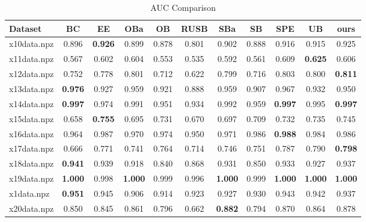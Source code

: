 \documentclass{article}
\begin{document}
\begin{table}[htbp]
\centering
\caption{AUC Comparison}
\begin{adjustbox}{width=\textwidth}
\label{tab:auc_comparison}
\begin{tabular}{lcccccccccc}
\hline
\textbf{Dataset} & \textbf{BC} & \textbf{EE} & \textbf{OBa} & \textbf{OB} & \textbf{RUSB} & \textbf{SBa} & \textbf{SB} & \textbf{SPE} & \textbf{UB} & \textbf{ours} \\
\hline
x10data.npz & 0.896 & \cellcolor{graybg}\textbf{0.926} & 0.899 & 0.878 & 0.801 & 0.902 & 0.888 & 0.916 & 0.915 & 0.925 \\
x11data.npz & 0.567 & 0.602 & 0.604 & 0.553 & 0.535 & 0.592 & 0.561 & 0.609 & \cellcolor{graybg}\textbf{0.625} & 0.606 \\
x12data.npz & 0.752 & 0.778 & 0.801 & 0.712 & 0.622 & 0.799 & 0.716 & 0.803 & 0.800 & \cellcolor{graybg}\textbf{0.811} \\
x13data.npz & \cellcolor{graybg}\textbf{0.976} & 0.927 & 0.959 & 0.921 & 0.888 & 0.959 & 0.907 & 0.967 & 0.932 & 0.950 \\
x14data.npz & \cellcolor{graybg}\textbf{0.997} & 0.974 & 0.991 & 0.951 & 0.934 & 0.992 & 0.959 & \cellcolor{graybg}\textbf{0.997} & 0.995 & \cellcolor{graybg}\textbf{0.997} \\
x15data.npz & 0.658 & \cellcolor{graybg}\textbf{0.755} & 0.695 & 0.731 & 0.670 & 0.697 & 0.709 & 0.732 & 0.735 & 0.745 \\
x16data.npz & 0.964 & 0.987 & 0.970 & 0.974 & 0.950 & 0.971 & 0.986 & \cellcolor{graybg}\textbf{0.988} & 0.984 & 0.986 \\
x17data.npz & 0.666 & 0.771 & 0.741 & 0.764 & 0.714 & 0.746 & 0.751 & 0.787 & 0.790 & \cellcolor{graybg}\textbf{0.798} \\
x18data.npz & \cellcolor{graybg}\textbf{0.941} & 0.939 & 0.918 & 0.840 & 0.868 & 0.931 & 0.850 & 0.933 & 0.927 & 0.937 \\
x19data.npz & \cellcolor{graybg}\textbf{1.000} & 0.998 & \cellcolor{graybg}\textbf{1.000} & 0.999 & 0.996 & \cellcolor{graybg}\textbf{1.000} & 0.999 & \cellcolor{graybg}\textbf{1.000} & \cellcolor{graybg}\textbf{1.000} & \cellcolor{graybg}\textbf{1.000} \\
x1data.npz & \cellcolor{graybg}\textbf{0.951} & 0.945 & 0.906 & 0.914 & 0.923 & 0.927 & 0.930 & 0.943 & 0.942 & 0.937 \\
x20data.npz & 0.850 & 0.845 & 0.861 & 0.796 & 0.662 & \cellcolor{graybg}\textbf{0.882} & 0.794 & 0.870 & 0.864 & 0.878 \\

\end{tabular}
\end{adjustbox}
\end{table}
\end{document}
